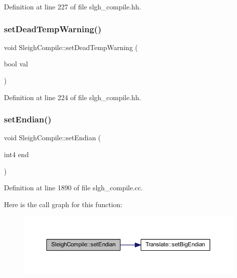 Definition at line 227 of file slgh\+\_\+compile.\+hh.

\mbox{\label{class_sleigh_compile_aa206cd0acacbdbf18d38cc0138926049}} 
\subsubsection{\texorpdfstring{setDeadTempWarning()}{setDeadTempWarning()}}
{\footnotesize\ttfamily void Sleigh\+Compile\+::set\+Dead\+Temp\+Warning (\begin{DoxyParamCaption}\item[{bool}]{val }\end{DoxyParamCaption})\hspace{0.3cm}{\ttfamily [inline]}}



Definition at line 224 of file slgh\+\_\+compile.\+hh.

\mbox{\label{class_sleigh_compile_a4790923ffdd979ec948a9396ab23b969}} 
\subsubsection{\texorpdfstring{setEndian()}{setEndian()}}
{\footnotesize\ttfamily void Sleigh\+Compile\+::set\+Endian (\begin{DoxyParamCaption}\item[{int4}]{end }\end{DoxyParamCaption})}



Definition at line 1890 of file slgh\+\_\+compile.\+cc.

Here is the call graph for this function\+:
\nopagebreak
\begin{figure}[H]
\begin{center}
\leavevmode
\includegraphics[width=350pt]{class_sleigh_compile_a4790923ffdd979ec948a9396ab23b969_cgraph}
\end{center}
\end{figure}
\mbox{\label{class_sleigh_compile_a32aa844100006a43c9ecc9e4273337b4}} 
